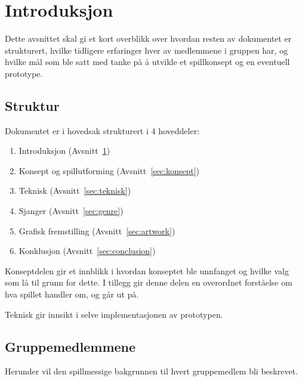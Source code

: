 \section{Introduksjon}\label{sec:intro}
Dette avsnittet skal gi et kort overblikk over hvordan resten av
dokumentet er strukturert, hvilke tidligere erfaringer hver av
medlemmene i gruppen har, og hvilke mål som ble satt med tanke på å
utvikle et spillkonsept og en eventuell prototype.

\subsection{Struktur}
Dokumentet er i hovedsak strukturert i 4 hoveddeler:
\begin{enumerate}
	\item Introduksjon (Avsnitt~\ref{sec:intro})
	\item Konsept og spillutforming (Avsnitt~\ref{sec:konsept})
	\item Teknisk (Avsnitt~\ref{sec:teknisk})
	\item Sjanger (Avsnitt~\ref{sec:genre})
	\item Grafisk fremstilling (Avsnitt~\ref{sec:artwork})
	\item Konklusjon (Avsnitt~\ref{sec:conclusion})
\end{enumerate}
Konseptdelen gir et innblikk i hvordan konseptet ble unnfanget og hvilke
valg som lå til grunn for dette. I tillegg gir denne delen en overordnet
forståelse om hva spillet handler om, og går ut på.

Teknisk gir innsikt i selve implementasjonen av prototypen.

\subsection{Gruppemedlemmene}
Herunder vil den spillmessige bakgrunnen til hvert gruppemedlem bli
beskrevet.

